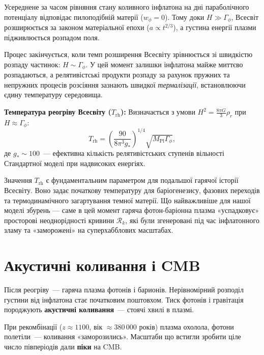 \documentclass[12pt, a4paper]{article}
\begin{document}
Усереднене за часом рівняння стану коливного інфлатона на дні параболічного потенціалу відповідає пилоподібній матерії ($w_\phi = 0$). Тому доки $H \gg \Gamma_\phi$, Всесвіт розширюється за законом матеріальної епохи ($a \propto t^{2/3}$), а густина енергії плазми підживлюється розпадом поля.



Процес закінчується, коли темп розширення Всесвіту зрівнюється зі швидкістю розпаду частинок: $H \sim \Gamma_\phi$. У цей момент залишки інфлатона майже миттєво розпадаються, а релятивістські продукти розпаду за рахунок пружних та непружних процесів розсіяння зазнають швидкої \emph{термалізації}, встановлюючи єдину температуру середовища.

\begin{keybox}
\textbf{Температура реогріву Всесвіту ($T_{\mathrm{rh}}$):}
Визначається з умови $H^2 = \frac{8\pi G}{3}\rho_r$ при $H \approx \Gamma_\phi$:
\begin{equation}\label{eq:t_reheating}
  T_{\mathrm{rh}} = \left( \frac{90}{8\pi^3 g_*} \right)^{1/4} \sqrt{M_{\mathrm{Pl}}\Gamma_\phi},
\end{equation}
де $g_* \sim 100$~--- ефективна кількість релятивістських ступенів вільності Стандартної моделі при надвисоких енергіях.
\end{keybox}

Значення $T_{\mathrm{rh}}$ є фундаментальним параметром для подальшої гарячої історії Всесвіту. Воно задає початкову температуру для баріогенезису, фазових переходів та термодинамічного загартування темної матерії. Що найважливіше для нашої моделі збурень — саме в цей момент гаряча фотон-баріонна плазма «успадковує» просторові неоднорідності кривини $\mathcal{R}_k$, які були згенеровані під час інфлатонного зламу та «заморожені» на суперхабблових масштабах.

\section{Акустичні коливання і CMB}

Після реогріву~--- гаряча плазма фотонів і барионів.
Нерівномірний розподіл густини від інфлатона стає початковим поштовхом.
Тиск фотонів і гравітація породжують \textbf{акустичні коливання}~---
стоячі хвилі в плазмі.

При рекомбінації ($z \approx 1100$, вік $\approx 380\,000$ років)
плазма охолола, фотони полетіли~--- коливання «заморозились».
Масштаби що встигли зробити ціле число півперіодів дали \textbf{піки} на CMB.
\end{document}
